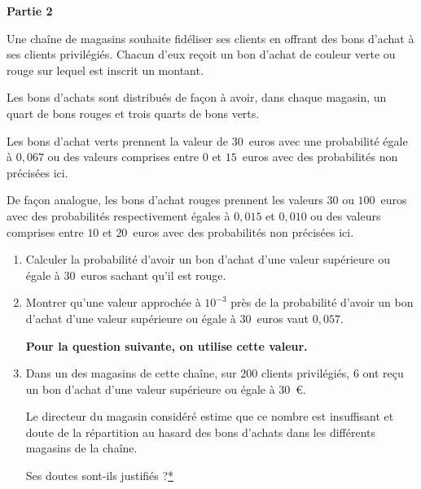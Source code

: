\documentclass[12pt,french]{article}
\begin{document}
\begin{question}[subtitle={Métropole 2015}]
\textbf{Partie 2}
	
	\medskip
	
Une chaîne de magasins souhaite fidéliser ses clients en offrant des bons d'achat à ses clients
privilégiés. Chacun d'eux reçoit un bon d'achat de couleur verte ou rouge sur lequel est inscrit un montant.
	
Les bons d'achats sont distribués de façon à avoir, dans chaque magasin, un quart de bons rouges et trois quarts de bons verts.
	
Les bons d'achat verts prennent la valeur de $30$~euros avec une probabilité égale à $0,067$ ou des valeurs comprises entre $0$ et $15$~euros avec des probabilités non précisées ici.
	
De façon analogue, les bons d'achat rouges prennent les valeurs $30$ ou $100$~euros avec des probabilités respectivement égales à $0,015$ et $0,010$ ou des valeurs comprises entre $10$ et $20$~euros avec des probabilités non précisées ici.

\medskip

\begin{enumerate}
\item Calculer la probabilité d'avoir un bon d'achat d'une valeur supérieure ou égale à $30$~euros sachant qu'il est rouge.
\item Montrer qu'une valeur approchée à $10^{-3}$ près de la probabilité d'avoir un bon d'achat d'une valeur supérieure ou égale à $30$~euros vaut $0,057$.

\textbf{Pour la question suivante, on utilise cette valeur.}

\item Dans un des magasins de cette chaîne, sur $200$ clients privilégiés, $6$ ont reçu un bon d'achat d'une valeur supérieure ou égale à $30$~\euro.

\smallskip

Le directeur du magasin considéré estime que ce nombre est insuffisant et doute de la répartition
au hasard des bons d'achats dans les différents magasins de la chaîne.

Ses doutes sont-ils justifiés ?\hyperlink{Index}{*}
\end{enumerate}

\end{question}
\end{document}
